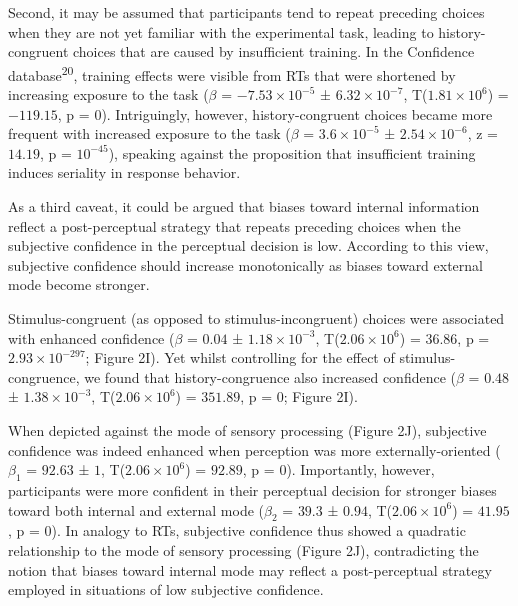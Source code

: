 \documentclass[
]{article}
\begin{document}
Second, it may be assumed that participants tend to repeat preceding
choices when they are not yet familiar with the experimental task,
leading to history-congruent choices that are caused by insufficient
training. In the Confidence database\textsuperscript{20}, training
effects were visible from RTs that were shortened by increasing exposure
to the task (\(\beta\) = \(\ensuremath{-7.53\times 10^{-5}}\) ±
\(\ensuremath{6.32\times 10^{-7}}\),
T(\(\ensuremath{1.81\times 10^{6}}\)) = \(-119.15\), p = \(0\)).
Intriguingly, however, history-congruent choices became more frequent
with increased exposure to the task (\(\beta\) =
\(\ensuremath{3.6\times 10^{-5}}\) ±
\(\ensuremath{2.54\times 10^{-6}}\), z = \(14.19\), p =
\(\ensuremath{10^{-45}}\)), speaking against the proposition that
insufficient training induces seriality in response behavior.

As a third caveat, it could be argued that biases toward internal
information reflect a post-perceptual strategy that repeats preceding
choices when the subjective confidence in the perceptual decision is
low. According to this view, subjective confidence should increase
monotonically as biases toward external mode become stronger.

Stimulus-congruent (as opposed to stimulus-incongruent) choices were
associated with enhanced confidence (\(\beta\) = \(0.04\) ±
\(\ensuremath{1.18\times 10^{-3}}\),
T(\(\ensuremath{2.06\times 10^{6}}\)) = \(36.86\), p =
\(\ensuremath{2.93\times 10^{-297}}\); Figure 2I). Yet whilst
controlling for the effect of stimulus-congruence, we found that
history-congruence also increased confidence (\(\beta\) = \(0.48\) ±
\(\ensuremath{1.38\times 10^{-3}}\),
T(\(\ensuremath{2.06\times 10^{6}}\)) = \(351.89\), p = \(0\); Figure
2I).

When depicted against the mode of sensory processing (Figure 2J),
subjective confidence was indeed enhanced when perception was more
externally-oriented (\(\beta_1\) = \(92.63\) ± \(1\),
T(\(\ensuremath{2.06\times 10^{6}}\)) = \(92.89\), p = \(0\)).
Importantly, however, participants were more confident in their
perceptual decision for stronger biases toward both internal and
external mode (\(\beta_2\) = \(39.3\) ± \(0.94\),
T(\(\ensuremath{2.06\times 10^{6}}\)) = \(41.95\), p = \(0\)). In
analogy to RTs, subjective confidence thus showed a quadratic
relationship to the mode of sensory processing (Figure 2J),
contradicting the notion that biases toward internal mode may reflect a
post-perceptual strategy employed in situations of low subjective
confidence.
\end{document}
